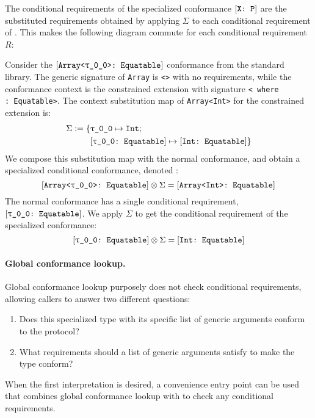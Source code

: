 \documentclass[../generics]{subfiles}
\begin{document}
The conditional requirements of the specialized conformance $[\texttt{X:~P}]$ are the substituted requirements obtained by applying $\Sigma$ to each conditional requirement of . This makes the following diagram commute for each conditional requirement~$R$:
\begin{center}
\newcommand{\GetConditionalRequirements}{\def\arraystretch{0.65}\arraycolsep=0pt\begin{array}{c}\text{get conditional}\\\text{requirement}\end{array}}
\end{center}

Consider the $\ConfReq{Array<\rT>}{Equatable}$ conformance from the standard library. The generic signature of \texttt{Array} is \texttt{<\rT>} with no requirements, while the conformance context is the constrained extension with signature \texttt{<\rT\ where \rT:~Equatable>}. The context substitution map of \texttt{Array<Int>} for the constrained extension is:
\begin{align*}
\Sigma := \SubstMapC{
&\SubstType{\rT}{Int}}{
\\
&\SubstConf{\rT}{Int}{Equatable}}
\end{align*}
We compose this substitution map with the normal conformance, and obtain a specialized conditional conformance, denoted :
\[
\ConfReq{Array<\rT>}{Equatable} \otimes \Sigma = \ConfReq{Array<Int>}{Equatable}
\]
The normal conformance has a single conditional requirement, $\ConfReq{\rT}{Equatable}$. We apply $\Sigma$ to get the conditional requirement of the specialized conformance:
\[
\ConfReq{\rT}{Equatable} \otimes \Sigma = \ConfReq{Int}{Equatable}
\]

\paragraph{Global conformance lookup.}
Global conformance lookup purposely does not check conditional requirements, allowing callers to answer two different questions:
\begin{enumerate}
\item Does this specialized type with its specific list of generic arguments conform to the protocol?
\item What requirements should a list of generic arguments satisfy to make the type conform?
\end{enumerate}
When the first interpretation is desired, a convenience entry point can be used that combines global conformance lookup with  to check any conditional requirements.
\end{document}
